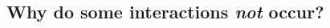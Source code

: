\documentclass[12pt]{article}
\begin{document}
\begin{spacing}{2.0}






    \subsection*{Why do some interactions \emph{not} occur?}


\end{spacing}
\end{document}
